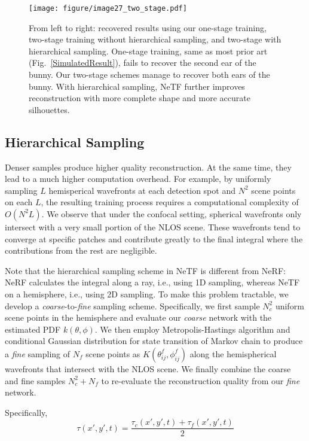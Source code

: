 \documentclass[10pt,journal,compsoc]{IEEEtran}
\begin{document}
\begin{figure}[!t]
\centering
\texttt{[image: figure/image27\_two\_stage.pdf]}
\caption{From left to right: recovered results using our one-stage training, two-stage training without hierarchical sampling, and two-stage with hierarchical sampling. One-stage training, same as most prior art (Fig.~\ref{SimulatedResult}), fails to recover the second ear of the bunny. Our two-stage schemes manage to recover both ears of the bunny. With hierarchical sampling, NeTF further improves reconstruction with more complete shape and more accurate silhouettes.}
\label{TwoStage}
\end{figure}

\subsection{Hierarchical Sampling}

Denser samples produce higher quality reconstruction. At the same time, they lead to a much higher computation overhead. For example, by uniformly sampling $L$ hemisperical wavefronts at each detection spot and $N^2$ scene points on each $L$, the resulting training process requires a computational complexity of $O(N^2L)$. We observe that under the confocal setting, spherical wavefronts only intersect with a very small portion of the NLOS scene. These wavefronts tend to converge at specific patches and contribute greatly to the final integral where the contributions from the rest are negligible.

Note that the hierarchical sampling scheme in NeTF is different from NeRF: NeRF calculates the integral along a ray, i.e., using 1D sampling, whereas NeTF on a hemisphere, i.e., using 2D sampling. To make this problem tractable, we develop a \textit{coarse}-to-\textit{fine} sampling scheme. Specifically, we first sample $N^2_c$ uniform scene points in the hemisphere and evaluate our \textit{coarse} network with the estimated PDF $k(\theta,\phi)$. We then employ Metropolis-Hastings algorithm and conditional Gaussian distribution for state transition of Markov chain to produce a \textit{fine} sampling of $N_f$ scene points as $K(\theta^{f}_{ij},\phi^{f}_{ij})$ along the hemispherical wavefronts that intersect with the NLOS scene. We finally combine the coarse and fine samples $N_c^2 + N_f$ to re-evaluate the reconstruction quality from our \textit{fine} network. 

Specifically, 
\begin{equation}
\tau(x',y',t) = \frac{\tau_c(x',y',t) + \tau_f(x',y',t)}{2}
\end{equation}
\end{document}
